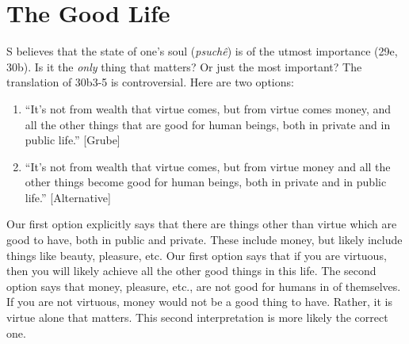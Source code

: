 \documentclass[10 pt]{article}
\begin{document}

\section*{The Good Life}

S believes that the state of one's soul (\emph{psuch\^{e}}) is of the utmost importance (29e, 30b). Is it the \emph{only} thing that matters? Or just the most important? The translation of 30b3-5 is controversial. Here are two options:
\begin{enumerate}
\item ``It's not from wealth that virtue comes, but from virtue comes money, and all the other things that are good for human beings, both in private and in public life.'' [Grube]
\item  ``It's not from wealth that virtue comes, but from virtue money and all the other things become good for human beings, both in private and in public life.'' [Alternative]
\end{enumerate}
Our first option explicitly says that there are things other than virtue which are good to have, both in public and private. These include money, but likely include things like beauty, pleasure, etc. Our first option says that if you are virtuous, then you will likely achieve all the other good things in this life. The second option says that money, pleasure, etc., are not good for humans in of themselves. If you are not virtuous, money would not be a good thing to have. Rather, it is virtue alone that matters. This second interpretation is more likely the correct one.
\end{document}
